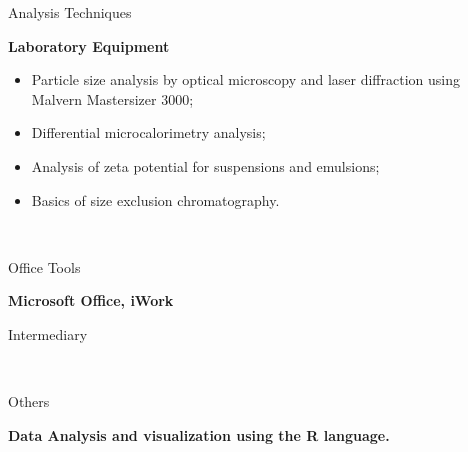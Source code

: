 \documentclass[a4paper, 12pt]{article}
\newcommand{\entry}[5]{
	\begin{minipage}[t]{.1\textwidth}
		\begin{flushright}
			\hfill
			{\textsc{#1}}

			{\textsc{#2}}
		\end{flushright}
	\end{minipage}
	\hfill\textcolor{Sepia}{\vline}\hfill
	\begin{minipage}[t]{.80\textwidth}

		#3
		
		\textcolor{Sepia}{\textbf{#4}}
		
		\footnotesize{#5}

	\end{minipage} \\ \vspace{.5cm}

}
\begin{document}
\renewcommand{\labelitemi}{\textendash}

\entry{}{}{Analysis Techniques}{Laboratory Equipment}{
	\begin{itemize}
		\item Particle size analysis by optical microscopy and laser diffraction using Malvern Mastersizer 3000;
		\item Differential microcalorimetry analysis;
		\item Analysis of zeta potential for suspensions and emulsions;
		\item Basics of size exclusion chromatography.	
	\end{itemize}}

\entry{}{}{Office Tools}{Microsoft Office, iWork}{Intermediary}

\entry{}{}{Others}{Data Analysis and visualization using the R language.}{}
\end{document}
